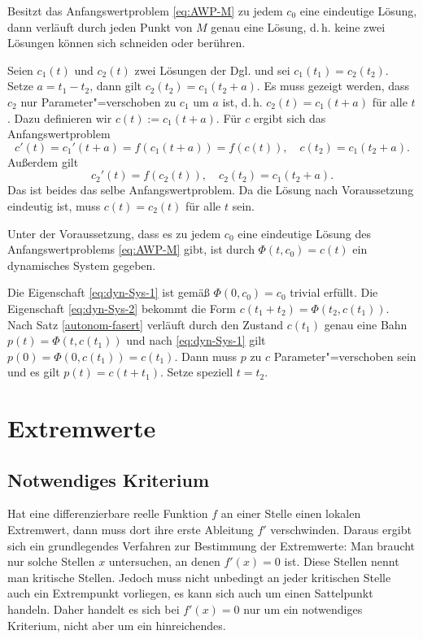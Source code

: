 \begin{theorem}\label{autonom-fasert}
Besitzt das Anfangswertproblem \eqref{eq:AWP-M} zu jedem $c_0$ eine
eindeutige Lösung, dann verläuft durch jeden Punkt von $M$ genau
eine Lösung, d.\,h. keine zwei Lösungen können sich schneiden
oder berühren.
\end{theorem}
\noindent{}
Seien $c_1(t)$ und $c_2(t)$ zwei Lösungen der Dgl. und sei
$c_1(t_1)=c_2(t_2)$. Setze $a=t_1-t_2$, dann gilt $c_2(t_2)=c_1(t_2+a)$.
Es muss gezeigt werden, dass $c_2$ nur Parameter"=verschoben
zu $c_1$ um $a$ ist, d.\,h. $c_2(t)=c_1(t+a)$ für alle $t$. Dazu
definieren wir $c(t):=c_1(t+a)$. Für $c$ ergibt sich das
Anfangswertproblem
\begin{equation}
c'(t) = c_1'(t+a) = f(c_1(t+a)) = f(c(t)),\quad c(t_2)=c_1(t_2+a).
\end{equation}
Außerdem gilt
\begin{equation}
c_2'(t) = f(c_2(t)), \quad c_2(t_2)=c_1(t_2+a).
\end{equation}
Das ist beides das selbe Anfangswertproblem. Da die Lösung nach
Voraussetzung eindeutig ist, muss $c(t)=c_2(t)$
für alle $t$ sein.\;\qedsymbol

\begin{theorem}
Unter der Voraussetzung, dass es zu jedem $c_0$ eine eindeutige
Lösung des Anfangswertproblems \eqref{eq:AWP-M} gibt, ist durch
$\Phi(t,c_0)=c(t)$ ein dynamisches System gegeben.
\end{theorem}
\noindent{}
Die Eigenschaft \eqref{eq:dyn-Sys-1} ist gemäß $\Phi(0,c_0)=c_0$
trivial erfüllt. Die Eigenschaft \eqref{eq:dyn-Sys-2} bekommt
die Form $c(t_1+t_2)=\Phi(t_2,c(t_1))$. Nach Satz
\ref{autonom-fasert} verläuft durch den Zustand $c(t_1)$ genau
eine Bahn $p(t)=\Phi(t,c(t_1))$ und nach \eqref{eq:dyn-Sys-1} gilt
$p(0)=\Phi(0,c(t_1))=c(t_1)$. Dann muss $p$ zu $c$ Parameter"=verschoben
sein und es gilt $p(t)=c(t+t_1)$. Setze speziell $t=t_2$.\;\qedsymbol

\newpage
\section{Extremwerte}

\subsection{Notwendiges Kriterium}

Hat eine differenzierbare reelle Funktion $f$ an einer Stelle einen
lokalen Extremwert, dann muss dort ihre erste Ableitung $f'$
verschwinden. Daraus ergibt sich ein grundlegendes Verfahren zur
Bestimmung der Extremwerte: Man braucht nur solche Stellen $x$
untersuchen, an denen $f'(x)=0$ ist. Diese Stellen nennt man
kritische Stellen. Jedoch muss nicht unbedingt an jeder kritischen
Stelle auch ein Extrempunkt vorliegen, es kann sich auch um einen
Sattelpunkt handeln. Daher handelt es sich bei $f'(x)=0$ nur um
ein notwendiges Kriterium, nicht aber um ein hinreichendes.

